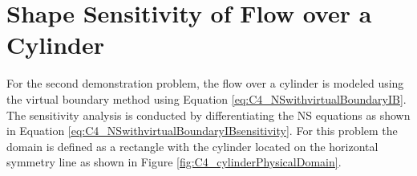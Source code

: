\section{Shape Sensitivity of Flow over a Cylinder}
For the second demonstration problem, the flow over a cylinder is modeled using the virtual boundary method using Equation \eqref{eq:C4_NSwithvirtualBoundaryIB}. The sensitivity analysis is conducted by differentiating the NS equations as shown in Equation \eqref{eq:C4_NSwithvirtualBoundaryIBsensitivity}. For this problem the domain is defined as a rectangle with the cylinder located on the horizontal symmetry line as shown in Figure \ref{fig:C4_cylinderPhysicalDomain}.